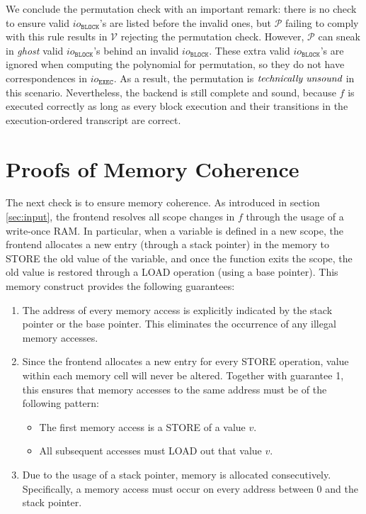 \documentclass{article}
\renewcommand{\P}{\mathcal{P}}
\newcommand{\V}{\mathcal{V}}
\newcommand{\iob}{io_{\mathtt{BLOCK}}}
\newcommand{\ioe}{io_{\mathtt{EXEC}}}
\begin{document}
We conclude the permutation check with an important remark: there is no check to ensure valid $\iob$'s are listed before the invalid ones, but $\P$ failing to comply with this rule results in $\V$ rejecting the permutation check. However, $\P$ can sneak in \emph{ghost} valid $\iob$'s behind an invalid $\iob$. These extra valid $\iob$'s are ignored when computing the polynomial for permutation, so they do not have correspondences in $\ioe$. As a result, the permutation is $\emph{technically unsound}$ in this scenario. Nevertheless, the backend is still complete and sound, because $f$ is executed correctly as long as every block execution and their transitions in the execution-ordered transcript are correct.


\section{Proofs of Memory Coherence}\label{sec:memory}

The next check is to ensure memory coherence. As introduced in section \ref{sec:input}, the frontend resolves all scope changes in $f$ through the usage of a write-once RAM. In particular, when a variable is defined in a new scope, the frontend allocates a new entry (through a stack pointer) in the memory to STORE the old value of the variable, and once the function exits the scope, the old value is restored through a LOAD operation (using a base pointer). This memory construct provides the following guarantees:
\begin{enumerate}
    \item The address of every memory access is explicitly indicated by the stack pointer or the base pointer. This eliminates the occurrence of any illegal memory accesses.
    \item Since the frontend allocates a new entry for every STORE operation, value within each memory cell will never be altered. Together with guarantee 1, this ensures that memory accesses to the same address must be of the following pattern:
    \begin{itemize}
        \item The first memory access is a STORE of a value $v$.
        \item All subsequent accesses must LOAD out that value $v$.
    \end{itemize}
    \item Due to the usage of a stack pointer, memory is allocated consecutively. Specifically, a memory access must occur on every address between 0 and the stack pointer.
\end{enumerate}
\end{document}
